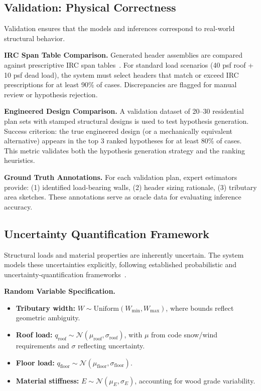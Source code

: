 \subsection{Validation: Physical Correctness}

Validation ensures that the models and inferences correspond to real-world structural behavior.

\textbf{IRC Span Table Comparison.}
Generated header assemblies are compared against prescriptive IRC span tables~\cite{irc2021}.
For standard load scenarios (40 psf roof + 10 psf dead load), the system must select headers that match or exceed IRC prescriptions for at least 90\% of cases.
Discrepancies are flagged for manual review or hypothesis rejection.

\textbf{Engineered Design Comparison.}
A validation dataset of 20--30 residential plan sets with stamped structural designs is used to test hypothesis generation.
Success criterion: the true engineered design (or a mechanically equivalent alternative) appears in the top 3 ranked hypotheses for at least 80\% of cases.
This metric validates both the hypothesis generation strategy and the ranking heuristics.

\textbf{Ground Truth Annotations.}
For each validation plan, expert estimators provide:
(1) identified load-bearing walls,
(2) header sizing rationale,
(3) tributary area sketches.
These annotations serve as oracle data for evaluating inference accuracy.

\subsection{Uncertainty Quantification Framework}

Structural loads and material properties are inherently uncertain. The system models these uncertainties explicitly, following established probabilistic and uncertainty-quantification frameworks~\cite{ang_tang_2007,ghanem_uq_handbook_2017}.

\textbf{Random Variable Specification.}
\begin{itemize}
  \item \textbf{Tributary width:} $W \sim \text{Uniform}(W_{\min}, W_{\max})$, where bounds reflect geometric ambiguity.
  \item \textbf{Roof load:} $q_{\text{roof}} \sim \mathcal{N}(\mu_{\text{roof}}, \sigma_{\text{roof}})$, with $\mu$ from code snow/wind requirements and $\sigma$ reflecting uncertainty.
  \item \textbf{Floor load:} $q_{\text{floor}} \sim \mathcal{N}(\mu_{\text{floor}}, \sigma_{\text{floor}})$.
  \item \textbf{Material stiffness:} $E \sim \mathcal{N}(\mu_E, \sigma_E)$, accounting for wood grade variability.
\end{itemize}

